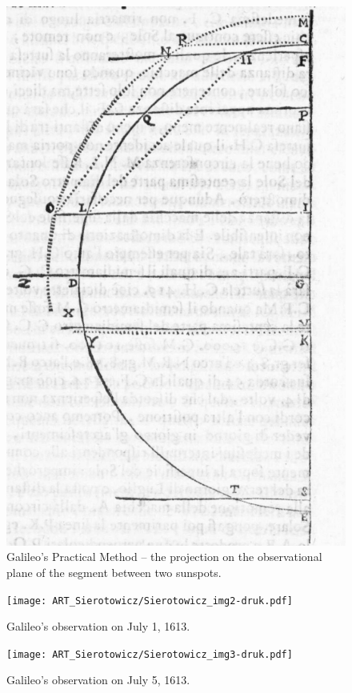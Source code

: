 \begin{artengenv}
\begin{figure}[h]
	\centering
	\includegraphics[width=1\textwidth]{ART_Sierotowicz/Sierotowicz_img1-druk.pdf} 
	\caption{Galileo’s Practical Method -- the projection on the observational plane of the segment between two sunspots.}
	\label{sier-fig1}
\end{figure}

\begin{figure}[h]
	\centering
	\texttt{[image: ART\_Sierotowicz/Sierotowicz\_img2-druk.pdf]} 
	\caption{Galileo’s observation on July 1, 1613.}
	\label{sier-fig2}
\end{figure}

\begin{figure}[h]
	\centering
	\texttt{[image: ART\_Sierotowicz/Sierotowicz\_img3-druk.pdf]} 
	\caption{Galileo’s observation on July 5, 1613.}
	\label{sier-fig3}
\end{figure}


\end{artengenv}
